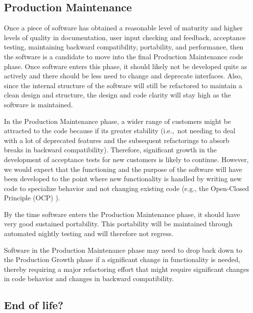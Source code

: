 \documentclass[11pt]{SANDreport}
\begin{document}
%
{}\subsection{Production Maintenance}
%

Once a piece of software has obtained a reasonable level of maturity and higher levels of quality in documentation, user input checking and feedback, acceptance testing, maintaining backward compatibility, portability, and performance, then the software is a candidate to move into the final Production Maintenance code phase.  Once software enters this phase, it should likely not be developed quite as actively and there should be less need to change and deprecate interfaces. Also, since the internal structure of the software will still be refactored to maintain a clean design and structure, the design and code clarity will stay high as the software is maintained.

In the Production Maintenance phase, a wider range of customers might be attracted to the code because if its greater stability (i.e.,\ not needing to deal with a lot of deprecated features and the subsequent refactorings to absorb breaks in backward compatibility).  Therefore, significant growth in the development of acceptance tests for new customers is likely to continue.  However, we would expect that the functioning and the purpose of the software will have been developed to the point where new functionality is handled by writing new code to specialize behavior and not changing existing code (e.g., the Open-Closed Principle (OCP) {}\cite{AgileSoftwareDevelopment}).

By the time software enters the Production Maintenance phase, it should have very good sustained portability.  This portability will be maintained through automated nightly testing and will therefore not regress.

Software in the Production Maintenance phase may need to drop back down to the Production Growth phase if a significant change in functionality is needed, thereby requiring a major refactoring effort that might require significant changes in code behavior and changes in backward compatibility.


%
\subsection{End of life?}
%
\end{document}
